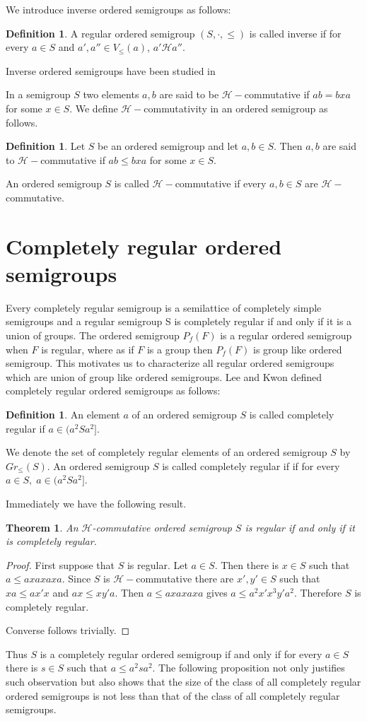 \documentclass[13pt]{article}
\newtheorem{Theorem}[theorem]{Theorem}
\theoremstyle{definition}
\newtheorem{Definition}[theorem]{Definition}
\theoremstyle{remark}
\numberwithin{equation}{section}
\newcommand{\hc}{\mathcal{H}}
\begin{document}
We introduce inverse ordered semigroups as follows:
\begin{Definition}
A regular ordered semigroup $(S, \cdot, \leq)$ is called inverse if for every $a \in S$ and $a', a'' \in V_{\leq}(a)$, $a' \hc a''$.
\end{Definition}

Inverse ordered semigroups have been studied in \cite{HJ1}

In a semigroup $S$ two elements $a, b$ are said to be
$\hc-$commutative if $ab =bxa$ for some $x \in S$. We define
$\hc-$commutativity in an ordered semigroup as follows.
\begin{Definition}
Let $S$ be an ordered semigroup and let $a, b \in S$. Then $a, b$
are said to $\hc-$commutative if  $ab \leq bxa$ for some  $x \in S$.
\end{Definition}
An ordered semigroup $S$ is called $\hc-$commutative if every  $a, b
\in S$ are $\hc-$commutative.




\section{Completely regular ordered semigroups}
Every completely regular semigroup is a semilattice of completely
simple semigroups and a regular semigroup S is completely regular if
and only if it is a union of groups. The ordered semigroup $P_f(F)$
is a  regular ordered semigroup when $F$ is regular,  where as if
$F$ is a group then $P_f(F)$ is group like ordered semigroup. This
motivates us to characterize all regular ordered semigroups which
are union of group like ordered semigroups.  Lee and Kwon \cite{LK}
defined completely regular ordered semigroups  as follows:
\begin{Definition}
An element $a$  of an ordered semigroup $S$ is called completely
regular if  $a \in (a^{2} S a^{2}]$.
\end{Definition}
We denote the set of completely regular elements of an ordered
semigroup $S$ by $Gr_\leq(S)$. An ordered semigroup $S$ is called
completely regular if if for every $a \in S, \;a \in  (a^2 S a^2]$.

Immediately we have the following result.
\begin{Theorem}\label{cr8}
An  $\hc$-commutative ordered semigroup $S$ is regular if and only
if it is completely regular.
\end{Theorem}
\begin{proof}
First suppose that $S$ is regular. Let $a \in S$. Then there is $x
\in S$ such that $a \leq axa x axa $. Since $S$ is $\hc-$commutative
there are $x', y' \in S$ such that $xa \leq ax'x$ and $ax \leq
xy'a$. Then $a \leq axa x axa $ gives $a \leq a^2 x'x^3 y'a^2$.
Therefore $S$ is completely regular.

Converse follows trivially.
\end{proof}
Thus $S$ is a completely regular ordered semigroup if and only if
for every $a \in S$ there is $s \in S$ such that $a \leq a^{2} s
a^{2}$. The following proposition not only justifies such
observation but also shows that the size of the class of all
completely regular ordered semigroups is not less than that of the
class of all completely regular semigroups.
\end{document}

